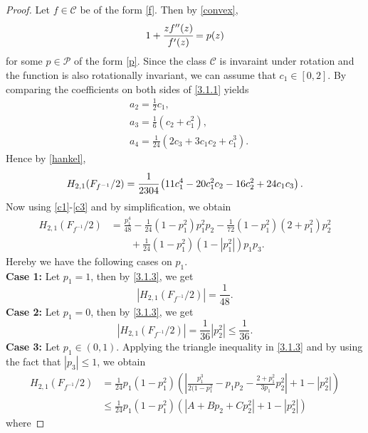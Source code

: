 \documentclass[a4paper,12pt]{amsart}
\theoremstyle{definition}
\numberwithin{equation}{section}
\begin{document}
\begin{proof}
Let $f\in \mathcal{C}$ be of the form \eqref{f}. Then by \eqref{convex},
\begin{equation}\label{3.1.1}
1+\cfrac{zf''(z)}{f'(z)}=p(z)
\end{equation}
for some $p \in \mathcal{P}$ of the form \eqref{p}. 
Since the class $\mathcal{C}$ is invaraint under rotation and the function is also rotationally invariant, we can assume that $c_1 \in [0,2]$.
By comparing the coefficients on both sides of \eqref{3.1.1} yields
	\begin{equation}\label{3.2.2}
		\begin{aligned}
			& a_2=\frac{1}{2}c_1, \\[2mm]
			& a_3=\frac{1}{6}(c_2+c_1^2), \\[2mm]
			& a_4=\frac{1}{24}\left(2c_3+3c_1c_2+c_1^3 \right).
		\end{aligned}
	\end{equation}
Hence by \eqref{hankel},
$$
H_{2,1}(F_{f^{-1}}/2)=\cfrac{1}{2304}\left(11c_1^4-20c_1^2c_2-16c_2^2+24c_1c_3\right).
$$
Now using \eqref{c1}-\eqref{c3} and by simplification, we obtain
\begin{equation}\label{3.1.3}
\begin{aligned}
H_{2,1}(F_{f^{-1}}/2)
&=\frac{p_1^4}{48}-\frac{1}{24}(1-p_1^2)p_1^2p_2-\frac{1}{72}(1-p_1^2)(2+p_1^2)p_2^2\\
& \quad \quad +\frac{1}{24}(1-p_1^2)(1-|p_1^2|)p_1p_3.
\end{aligned}
\end{equation}
Hereby we have the following cases on $p_1$.
\\[1mm]
\textbf{Case 1:} Let $p_1=1$, then by \eqref{3.1.3}, we get
$$
|H_{2,1}(F_{f^{-1}}/2)|=\frac{1}{48}.
$$
\textbf{Case 2:} Let $p_1=0$, then by \eqref{3.1.3}, we get
$$
|H_{2,1}(F_{f^{-1}}/2)|=\frac{1}{36}|p_2^2|\leq\frac{1}{36}.
$$
\textbf{Case 3:} Let $p_1 \in (0,1)$. Applying the triangle inequality in \eqref{3.1.3} and by using the fact
that $|p_3| \leq 1$, we obtain
\begin{equation}\label{3.1.4}
\begin{aligned}
H_{2,1}(F_{f^{-1}}/2)
&=\frac{1}{24}p_1(1-p_1^2)\left(\left| \frac{p_1^3}{2(1-p_1^2}-p_1 p_2-\frac{2+p_1^2}{3p_1}p_2^2 \right|+1-|p_2^2|\right)\\[2mm]
&\leq \frac{1}{24}p_1(1-p_1^2)\left(\left| A+B p_2+C p_2^2 \right|+1-|p_2^2|\right)
\end{aligned}
\end{equation}
where 

\end{proof}
\end{document}
